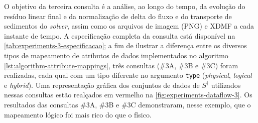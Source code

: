 O objetivo da terceira consulta é a análise, ao longo do tempo, da evolução do resíduo linear final e da normalização de delta do fluxo e do transporte de sedimentos do \textit{solver}, assim como os arquivos de imagem (PNG) e XDMF a cada instante de tempo. A especificação completa da consulta está disponível na \autoref{tab:experiments-3-especificacao}; a fim de ilustrar a diferença entre os diversos tipos de mapeamento de atributos de dados implementados no algoritmo \autoref{lst:algorithm-attribute-mappings}, três consultas (\#3A, \#3B e \#3C) foram realizadas, cada qual com um tipo diferente no argumento \texttt{type} (\textit{physical}, \textit{logical} e \textit{hybrid}). Uma representação gráfica dos conjuntos de dados de \(S^{\dagger}\) utilizados nessas consultas estão realçados em vermelho na \autoref{fig:experiments-dataflow-3}. Os resultados das consultas \#3A, \#3B e \#3C demonstraram, nesse exemplo, que o mapeamento lógico foi mais rico do que o físico.

